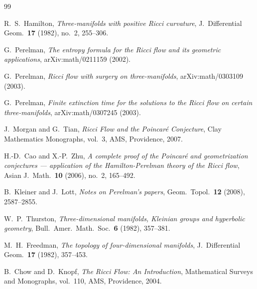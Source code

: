 \documentclass[12pt,a4paper]{amsart}
\theoremstyle{definition}
\theoremstyle{remark}
\begin{document}
\begin{thebibliography}{99}

R.~S.~Hamilton,
\textit{Three-manifolds with positive Ricci curvature},
J.\ Differential Geom.\ \textbf{17} (1982), no.~2, 255--306.

G.~Perelman,
\textit{The entropy formula for the Ricci flow and its geometric applications},
arXiv:math/0211159 (2002).

G.~Perelman,
\textit{Ricci flow with surgery on three-manifolds},
arXiv:math/0303109 (2003).

G.~Perelman,
\textit{Finite extinction time for the solutions to the Ricci flow on certain three-manifolds},
arXiv:math/0307245 (2003).

J.~Morgan and G.~Tian,
\textit{Ricci Flow and the Poincar\'{e} Conjecture},
Clay Mathematics Monographs, vol.~3, AMS, Providence, 2007.

H.-D.~Cao and X.-P.~Zhu,
\textit{A complete proof of the Poincar\'{e} and geometrization conjectures ---
application of the Hamilton-Perelman theory of the Ricci flow},
Asian J.\ Math.\ \textbf{10} (2006), no.~2, 165--492.

B.~Kleiner and J.~Lott,
\textit{Notes on Perelman's papers},
Geom.\ Topol.\ \textbf{12} (2008), 2587--2855.

W.~P.~Thurston,
\textit{Three-dimensional manifolds, Kleinian groups and hyperbolic geometry},
Bull.\ Amer.\ Math.\ Soc.\ \textbf{6} (1982), 357--381.

M.~H.~Freedman,
\textit{The topology of four-dimensional manifolds},
J.\ Differential Geom.\ \textbf{17} (1982), 357--453.

B.~Chow and D.~Knopf,
\textit{The Ricci Flow: An Introduction},
Mathematical Surveys and Monographs, vol.~110, AMS, Providence, 2004.

\end{thebibliography}
\end{document}
